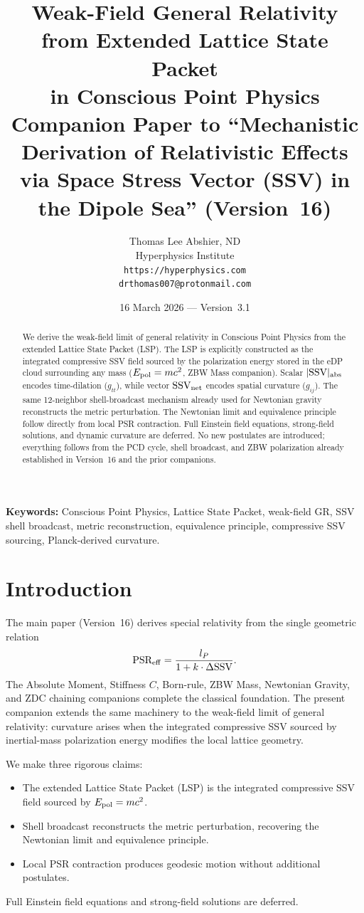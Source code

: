 \documentclass[12pt]{article}
\title{\textbf{Weak-Field General Relativity from Extended Lattice State Packet\\
in Conscious Point Physics}\\[6pt]
{\large Companion Paper to ``Mechanistic Derivation of Relativistic Effects\\
via Space Stress Vector (SSV) in the Dipole Sea'' (Version~16)}}
\author{Thomas Lee Abshier, ND\\
Hyperphysics Institute\\
\texttt{https://hyperphysics.com}\\
\texttt{drthomas007@protonmail.com}}
\date{16 March 2026 --- Version~3.1}
\newcommand{\lP}{l_P}
\newcommand{\SSV}{\text{SSV}}
\begin{document}
\maketitle

\noindent\textbf{Keywords:} Conscious Point Physics, Lattice State Packet, weak-field GR, SSV shell broadcast, metric reconstruction, equivalence principle, compressive SSV sourcing, Planck-derived curvature.

\begin{abstract}
We derive the weak-field limit of general relativity in Conscious Point Physics from the extended Lattice State Packet (LSP). The LSP is explicitly constructed as the integrated compressive SSV field sourced by the polarization energy stored in the eDP cloud surrounding any mass (\(E_{\rm pol} = mc^2\), ZBW Mass companion). Scalar \(|\SSV|_{\rm abs}\) encodes time-dilation (\(g_{tt}\)), while vector \(\SSV_{\rm net}\) encodes spatial curvature (\(g_{ij}\)). The same 12-neighbor shell-broadcast mechanism already used for Newtonian gravity reconstructs the metric perturbation. The Newtonian limit and equivalence principle follow directly from local PSR contraction. Full Einstein field equations, strong-field solutions, and dynamic curvature are deferred. No new postulates are introduced; everything follows from the PCD cycle, shell broadcast, and ZBW polarization already established in Version~16 and the prior companions.
\end{abstract}

\section{Introduction}
The main paper (Version~16) derives special relativity from the single geometric relation
\[
\text{PSR}_{\rm eff} = \frac{\lP}{1 + k \cdot \Delta\SSV}.
\]
The Absolute Moment, Stiffness \(C\), Born-rule, ZBW Mass, Newtonian Gravity, and ZDC chaining companions complete the classical foundation. The present companion extends the same machinery to the weak-field limit of general relativity: curvature arises when the integrated compressive SSV sourced by inertial-mass polarization energy modifies the local lattice geometry.

We make three rigorous claims:
\begin{itemize}
\item The extended Lattice State Packet (LSP) is the integrated compressive SSV field sourced by \(E_{\rm pol} = mc^2\).
\item Shell broadcast reconstructs the metric perturbation, recovering the Newtonian limit and equivalence principle.
\item Local PSR contraction produces geodesic motion without additional postulates.
\end{itemize}
Full Einstein field equations and strong-field solutions are deferred.
\end{document}
